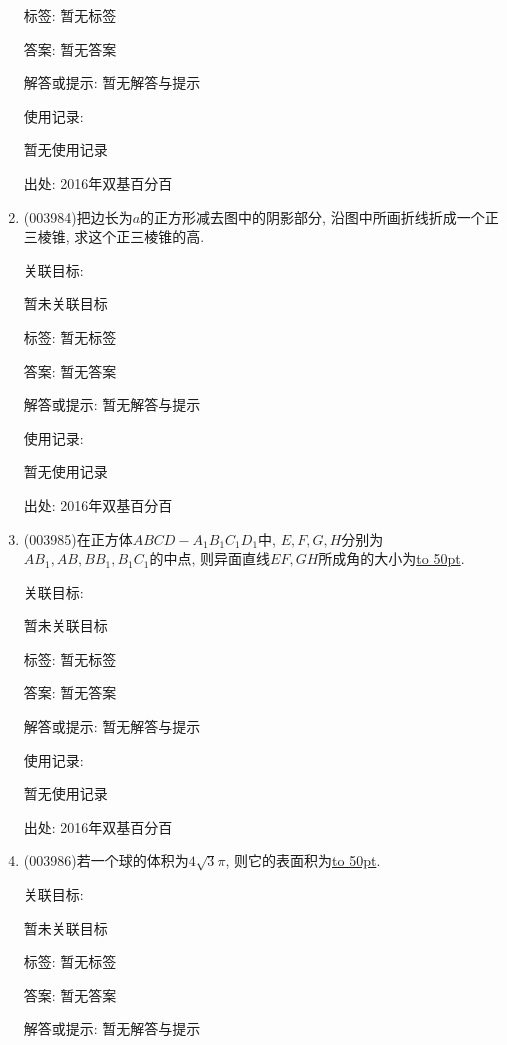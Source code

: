 \documentclass[10pt,a4paper]{article}
\newcommand{\blank}[1]{\underline{\hbox to #1pt{}}}
\begin{document}
\begin{enumerate}[1.]
标签: 暂无标签

答案: 暂无答案

解答或提示: 暂无解答与提示

使用记录:

暂无使用记录


出处: 2016年双基百分百
\item { (003984)}把边长为$a$的正方形减去图中的阴影部分, 沿图中所画折线折成一个正三棱锥, 求这个正三棱锥的高.
\begin{center}
\end{center}


关联目标:

暂未关联目标



标签: 暂无标签

答案: 暂无答案

解答或提示: 暂无解答与提示

使用记录:

暂无使用记录


出处: 2016年双基百分百
\item { (003985)}在正方体$ABCD-A_1B_1C_1D_1$中, $E,F,G,H$分别为$AB_1,AB,BB_1,B_1C_1$的中点, 则异面直线$EF,GH$所成角的大小为\blank{50}.


关联目标:

暂未关联目标



标签: 暂无标签

答案: 暂无答案

解答或提示: 暂无解答与提示

使用记录:

暂无使用记录


出处: 2016年双基百分百
\item { (003986)}若一个球的体积为$4\sqrt{3}\pi$, 则它的表面积为\blank{50}.


关联目标:

暂未关联目标



标签: 暂无标签

答案: 暂无答案

解答或提示: 暂无解答与提示


\end{enumerate}
\end{document}
